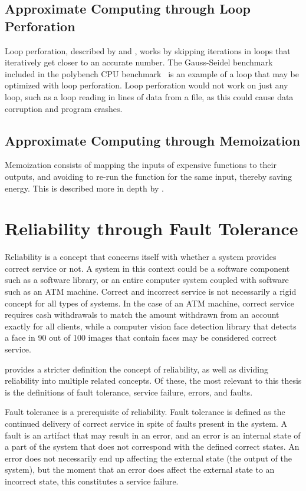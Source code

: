 \subsection{Approximate Computing through Loop Perforation}

Loop perforation, described by \citet{li2018sculptor} and \citet{baek2010green}, works by skipping iterations in loops that iteratively get closer to an accurate number. The Gauss-Seidel benchmark included in the polybench CPU benchmark~\citep{polybench} is an example of a loop that may be optimized with loop perforation. Loop perforation would not work on just any loop, such as a loop reading in lines of data from a file, as this could cause data corruption and program crashes.

\subsection{Approximate Computing through Memoization}

Memoization consists of mapping the inputs of expensive functions to their outputs, and avoiding to re-run the function for the same input, thereby saving energy. This is described more in depth by \citet{mittal2016survey}.


\section{Reliability through Fault Tolerance}
\label{section:Reliability_thorugh_fault_tolerance}

Reliability is a concept that concerns itself with whether a system provides correct service or not. A system in this context could be a software component such as a software library, or an entire computer system coupled with software such as an ATM machine. Correct and incorrect service is not necessarily a rigid concept for all types of systems. In the case of an ATM machine, correct service requires cash withdrawals to match the amount withdrawn from an account exactly for all clients, while a computer vision face detection library that detects a face in 90 out of 100 images that contain faces may be considered correct service.

\citet{avizienis2004basic} provides a stricter definition the concept of reliability, as well as dividing reliability into multiple related concepts. Of these, the most relevant to this thesis is the definitions of fault tolerance, service failure, errors, and faults.  

Fault tolerance is a prerequisite of reliability. Fault tolerance is defined as the continued delivery of correct service in spite of faults present in the system. A fault is an artifact that may result in an error, and an error is an internal state of a part of the system that does not correspond with the defined correct states. An error does not necessarily end up affecting the external state (the output of the system), but the moment that an error does affect the external state to an incorrect state, this constitutes a service failure.

